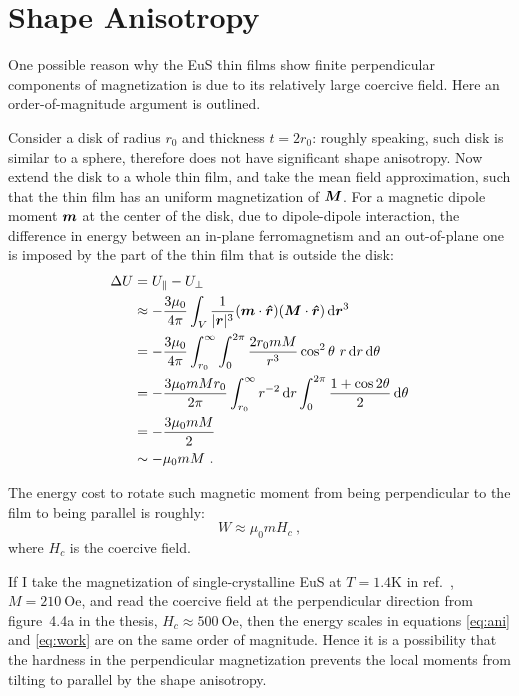 \documentclass[11pt]{article}
\newcommand*\diff{\mathop{}\!\mathrm{d}}    %
\renewcommand{\vec}[1]{\vectorbold*{#1}} %
\renewcommand{\op}[1]{\vectorbold*{\hat#1}} %
\begin{document}
\section{Shape Anisotropy}
One possible reason why the EuS thin films show finite perpendicular components of magnetization is due to its relatively large coercive field. Here an order-of-magnitude argument is outlined.

Consider a disk of radius $r_0$ and thickness $t=2r_0$: roughly speaking, such disk is similar to a sphere, therefore does not have significant shape anisotropy. Now extend the disk to a whole thin film, and take the mean field approximation, such that the thin film has an uniform magnetization of $\vec{M}$. For a magnetic dipole moment $\vec{m}$ at the center of the disk, due to dipole-dipole interaction, the difference in energy between an in-plane ferromagnetism and an out-of-plane one is imposed by the part of the thin film that is outside the disk:
\begin{align}
    \Delta U &= U_\parallel - U_\perp\\
        &\approx -\frac{3\mu_0}{4\pi}\int_V\frac{1}{|\vec{r}|^3}(\vec{m}\cdot\op{r})(\vec{M}\cdot\op{r})\diff \vec{r}^3\\
        &= -\frac{3\mu_0}{4\pi}\int_{r_0}^\infty\int_0^{2\pi}\frac{2r_0mM}{r^3}\cos^2\theta~r\diff r\diff\theta\\
        &= -\frac{3\mu_0mMr_0}{2\pi}\int_{r_0}^\infty r^{-2}\diff r\int_0^{2\pi} \frac{1+\cos2\theta}{2}\diff\theta\\
        &= -\frac{3\mu_0mM}{2}\\
        &\sim -\mu_0mM\label{eq:ani}~.
\end{align}

The energy cost to rotate such magnetic moment from being perpendicular to the film to being parallel is roughly:
\begin{equation}
    W \approx \mu_0mH_c~,\label{eq:work}
\end{equation}
where $H_c$ is the coercive field.

If I take the magnetization of single-crystalline EuS at $T=1.4\mathrm{K}$ in ref.~\cite{EuS_Shafer}, $M = 210~\mathrm{Oe}$, and read the coercive field at the perpendicular direction from figure~4.4a in the thesis, $H_c \approx 500~\mathrm{Oe}$, then the energy scales in equations \ref{eq:ani} and \ref{eq:work} are on the same order of magnitude. Hence it is a possibility that the hardness in the perpendicular magnetization prevents the local moments from tilting to parallel by the shape anisotropy.

\printbibliography
\end{document}
